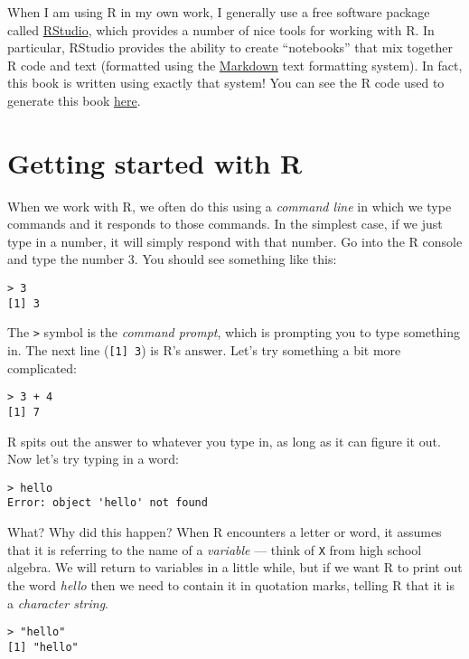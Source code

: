 \documentclass[12pt,]{book}
\begin{document}
When I am using R in my own work, I generally use a free software package called \href{https://rstudio.com/}{RStudio}, which provides a number of nice tools for working with R. In particular, RStudio provides the ability to create ``notebooks'' that mix together R code and text (formatted using the \href{https://daringfireball.net/projects/markdown/}{Markdown} text formatting system). In fact, this book is written using exactly that system! You can see the R code used to generate this book \href{https://github.com/poldrack/psych10-book}{here}.

\hypertarget{getting-started-with-r}{%
\section{Getting started with R}\label{getting-started-with-r}}

When we work with R, we often do this using a \emph{command line} in which we type commands and it responds to those commands. In the simplest case, if we just type in a number, it will simply respond with that number. Go into the R console and type the number 3. You should see something like this:

\begin{verbatim}
> 3
[1] 3
\end{verbatim}

The \texttt{\textgreater{}} symbol is the \emph{command prompt}, which is prompting you to type something in. The next line (\texttt{{[}1{]}\ 3}) is R's answer. Let's try something a bit more complicated:

\begin{verbatim}
> 3 + 4
[1] 7
\end{verbatim}

R spits out the answer to whatever you type in, as long as it can figure it out. Now let's try typing in a word:

\begin{verbatim}
> hello
Error: object 'hello' not found
\end{verbatim}

What? Why did this happen? When R encounters a letter or word, it assumes that it is referring to the name of a \emph{variable} --- think of \texttt{X} from high school algebra. We will return to variables in a little while, but if we want R to print out the word \emph{hello} then we need to contain it in quotation marks, telling R that it is a \emph{character string}.

\begin{verbatim}
> "hello"
[1] "hello"
\end{verbatim}
\end{document}
